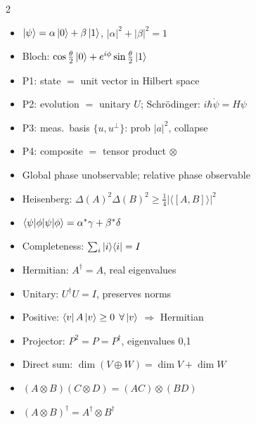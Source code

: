 \documentclass[10pt,a4paper]{article}
\begin{document}
\begin{multicols}{2}

\begin{tcolorbox}[cheatstyle, title={Qubit \& Postulates}]
\begin{itemize}[nosep,leftmargin=*]
\item $\ket{\psi}=\alpha\ket{0}+\beta\ket{1}$, $|\alpha|^2+|\beta|^2=1$
\item Bloch: $\cos\frac{\theta}{2}\ket{0}+e^{i\phi}\sin\frac{\theta}{2}\ket{1}$
\item P1: state $=$ unit vector in Hilbert space
\item P2: evolution $=$ unitary $U$; Schr\"odinger: $i\hbar\dot\psi=H\psi$
\item P3: meas.\ basis $\{u,u^\perp\}$: prob $|a|^2$, collapse
\item P4: composite $=$ tensor product $\otimes$
\item Global phase unobservable; relative phase observable
\item Heisenberg: $\Delta(A)^2\Delta(B)^2\ge\frac{1}{4}|\langle[A,B]\rangle|^2$
\end{itemize}
\end{tcolorbox}

\begin{tcolorbox}[cheatstyle, title={Linear Algebra}]
\begin{itemize}[nosep,leftmargin=*]
\item $\braket{\psi|\phi}=\alpha^*\gamma+\beta^*\delta$
\item Completeness: $\sum_i\ket{i}\!\bra{i}=I$
\item Hermitian: $A^\dagger=A$, real eigenvalues
\item Unitary: $U^\dagger U=I$, preserves norms
\item Positive: $\bra{v}A\ket{v}\ge 0$ $\forall\ket{v}$ $\Rightarrow$ Hermitian
\item Projector: $P^2=P=P^\dagger$, eigenvalues 0,1
\item Direct sum: $\dim(V\oplus W)=\dim V+\dim W$
\item $(A\otimes B)(C\otimes D)=(AC)\otimes(BD)$
\item $(A\otimes B)^\dagger=A^\dagger\otimes B^\dagger$
\end{itemize}
\end{tcolorbox}


\end{multicols}
\end{document}
